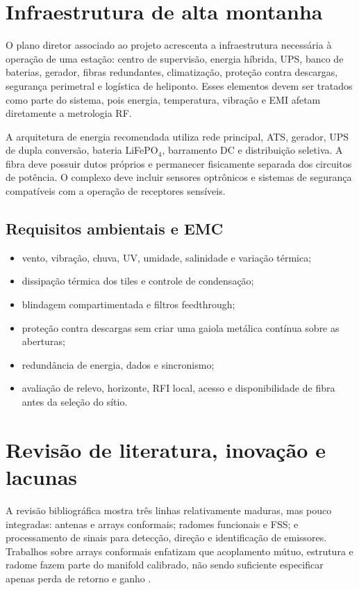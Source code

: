 \documentclass[11pt,a4paper]{report}
\begin{document}
\chapter{Infraestrutura de alta montanha}

O plano diretor associado ao projeto acrescenta a infraestrutura necessária à operação de uma estação: centro de supervisão, energia híbrida, UPS, banco de baterias, gerador, fibras redundantes, climatização, proteção contra descargas, segurança perimetral e logística de heliponto. Esses elementos devem ser tratados como parte do sistema, pois energia, temperatura, vibração e EMI afetam diretamente a metrologia RF.

A arquitetura de energia recomendada utiliza rede principal, ATS, gerador, UPS de dupla conversão, bateria LiFePO$_4$, barramento DC e distribuição seletiva. A fibra deve possuir dutos próprios e permanecer fisicamente separada dos circuitos de potência. O complexo deve incluir sensores optrônicos e sistemas de segurança compatíveis com a operação de receptores sensíveis.

\section{Requisitos ambientais e EMC}
\begin{itemize}
\item vento, vibração, chuva, UV, umidade, salinidade e variação térmica;
\item dissipação térmica dos tiles e controle de condensação;
\item blindagem compartimentada e filtros feedthrough;
\item proteção contra descargas sem criar uma gaiola metálica contínua sobre as aberturas;
\item redundância de energia, dados e sincronismo;
\item avaliação de relevo, horizonte, RFI local, acesso e disponibilidade de fibra antes da seleção do sítio.
\end{itemize}

\chapter{Revisão de literatura, inovação e lacunas}

A revisão bibliográfica mostra três linhas relativamente maduras, mas pouco integradas: antenas e arrays conformais; radomes funcionais e FSS; e processamento de sinais para detecção, direção e identificação de emissores. Trabalhos sobre arrays conformais enfatizam que acoplamento mútuo, estrutura e radome fazem parte do manifold calibrado, não sendo suficiente especificar apenas perda de retorno e ganho \citep{caratelli2011,liberal2011}.
\end{document}
